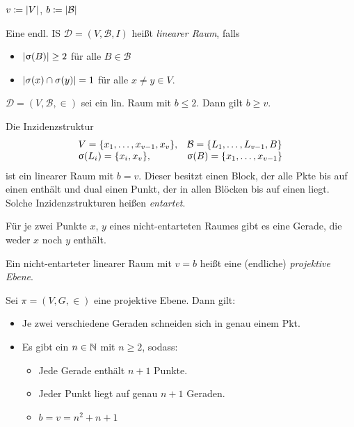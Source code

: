 \documentclass{cheat-sheet}
\newcommand{\Design}{\mathcal{D}} %
\newcommand{\Blocks}{\mathcal{B}} %
\begin{document}
\begin{nota}
  $v \coloneqq \lvert V\rvert$, \enspace
  $b \coloneqq \abs{\Blocks}$
\end{nota}

\begin{defn}
  Eine endl. IS $\Design = (V, \Blocks, I)$ heißt \emph{linearer Raum}, falls
  \begin{itemize}
    \item $\lvert\upsigma(B)\rvert \geq 2$ für alle $B \in \Blocks$
    \item $\lvert\sigma(x) \cap \sigma(y)\rvert = 1$ für alle $x \neq y \in V$.
  \end{itemize}
\end{defn}


\begin{satz}
  $\Design = (V, \Blocks, {\in})$ sei ein lin. Raum mit $b \leq 2$.
  Dann gilt $b \geq v$.
\end{satz}


\begin{bsp}
  Die Inzidenzstruktur
  \[
    \begin{array}{l l}
      V = \{ x_1, \ldots, x_{v-1}, x_v \},
      & \Blocks = \{ L_1, \ldots, L_{v-1}, B \} \\
      \upsigma(L_i) = \{ x_i, x_v \},
      & \upsigma(B) = \{ x_1, \ldots, x_{v-1} \}
    \end{array}
  \]
  ist ein linearer Raum mit $b = v$.
  Dieser besitzt einen Block, der alle Pkte bis auf einen enthält und dual einen Punkt, der in allen Blöcken bis auf einen liegt.
  Solche Inzidenzstrukturen heißen \emph{entartet}.
\end{bsp}

\begin{lem}
  Für je zwei Punkte $x$, $y$ eines nicht-entarteten Raumes gibt es eine Gerade, die weder $x$ noch $y$ enthält.
\end{lem}

\begin{defn}
  Ein nicht-entarteter linearer Raum mit $v = b$ heißt eine (endliche) \emph{projektive Ebene}.
\end{defn}

\begin{satz}
  Sei $\pi = (V, G, {\in})$ eine projektive Ebene.
  Dann gilt:
  \begin{itemize}
    \item Je zwei verschiedene Geraden schneiden sich in genau einem Pkt.
    \item Es gibt ein $n \in \mathbb{N}$ mit $n \geq 2$, sodass:
    \begin{itemize}
      \item Jede Gerade enthält $n+1$ Punkte.
      \item Jeder Punkt liegt auf genau $n+1$ Geraden.
      \item $b = v = n^2 + n + 1$
    \end{itemize}
  \end{itemize}
\end{satz}
\end{document}
